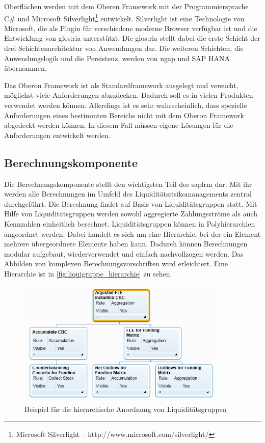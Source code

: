 \begin{onehalfspacing}
Oberflächen werden mit dem Oberen Framework mit der Programmiersprache C\# und Microsoft Silverlight\footnote{Microsoft Silverlight -- http://www.microsoft.com/silverlight/} entwickelt. Silverlight ist eine Technologie von Microsoft, die als Plugin für verschiedene moderne Browser verfügbar ist und die Entwicklung von \gls{glos:ria} unterstützt. Die \gls{glos:ria} stellt dabei die erste Schicht der drei Schichtenarchitektur von Anwendungen dar. Die weiteren Schichten, die Anwendungslogik und die Persistenz, werden von \gls{ngap} und SAP HANA übernommen.

Das Oberon Framework ist als Standardframework ausgelegt und versucht, möglichst viele Anforderungen abzudecken. Dadurch soll es in vielen Produkten verwendet werden können. Allerdings ist es sehr wahrscheinlich, dass spezielle Anforderungen eines bestimmten Bereichs nicht mit dem Oberon Framework abgedeckt werden können. In diesem Fall müssen eigene Lösungen für die Anforderungen entwickelt werden.

\subsection{Berechnungskomponente}
\label{sec:berechnungskomponente}
Die Berechnungskomponente stellt den wichtigsten Teil des \gls{saplrm} dar. Mit ihr werden alle Berechnungen im Umfeld des Liquiditätsrisikomanagements zentral durchgeführt. Die Berechnung findet auf Basis von Liquiditätsgruppen statt. Mit Hilfe von Liquiditätsgruppen werden sowohl aggregierte Zahlungsströme als auch Kennzahlen einheitlich berechnet. Liquiditätsgruppen können in Polyhierarchien angeordnet werden. Dabei handelt es sich um eine Hierarchie, bei der ein Element mehrere übergeordnete Elemente haben kann. Dadurch können Berechnungen modular aufgebaut, wiederverwendet und einfach nachvollzogen werden. Das Abbilden von komplexen Berechnungsvorschriften wird erleichtert. Eine Hierarchie ist in \vref{fig:liquigruppe_hierarchie} zu sehen.

\begin{figure}[ht]
\centering
\setlength{\unitlength}{1mm}
\includegraphics[width=10cm]{images/liquigruppe_hierarchie.PNG}
\caption{
Beispiel für die hierarchische Anordnung von Liquiditätsgruppen
\label{fig:liquigruppe_hierarchie}}
\end{figure}


\end{onehalfspacing}
